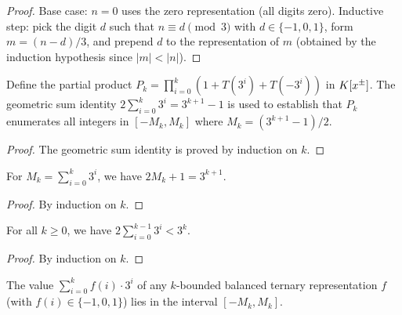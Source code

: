 \begin{proof}
Base case: $n = 0$ uses the zero representation (all digits zero).
Inductive step: pick the digit $d$ such that $n \equiv d \pmod{3}$
with $d \in \{-1, 0, 1\}$, form $m = (n - d)/3$, and prepend $d$
to the representation of $m$ (obtained by the induction hypothesis
since $|m| < |n|$).
\end{proof}

\begin{lemma}
\label{lem.fps.laure.partial-product}
\leanhelper
\leanok
Define the partial product
$P_k = \prod_{i=0}^{k} (1 + T(3^i) + T(-3^i))$ in $K[x^{\pm}]$.
The geometric sum identity
$2 \sum_{i=0}^{k} 3^i = 3^{k+1} - 1$
is used to establish that $P_k$ enumerates all integers
in $[-M_k, M_k]$ where $M_k = (3^{k+1}-1)/2$.
\end{lemma}

\begin{proof}
The geometric sum identity is proved by induction on $k$.
\end{proof}

\begin{lemma}[Cardinality identity: $2 M_k + 1 = 3^{k+1}$]
\label{lem.fps.laure.maxBT-eq}
\leanhelper
\leanok
For $M_k = \sum_{i=0}^{k} 3^i$, we have $2 M_k + 1 = 3^{k+1}$.
\end{lemma}

\begin{proof}
\leanok
By induction on $k$.
\end{proof}

\begin{lemma}[$2 \sum_{i<k} 3^i < 3^k$]
\label{lem.fps.laure.two-sum-lt}
\leanhelper
\leanok
For all $k \ge 0$, we have $2 \sum_{i=0}^{k-1} 3^i < 3^k$.
\end{lemma}

\begin{proof}
\leanok
By induction on $k$.
\end{proof}

\begin{lemma}
\label{lem.fps.laure.kBoundedBTValue-mem}
\leanhelper
\leanok
The value $\sum_{i=0}^{k} f(i) \cdot 3^i$ of any $k$-bounded
balanced ternary representation $f$ (with $f(i) \in \{-1, 0, 1\}$)
lies in the interval $[-M_k, M_k]$.
\end{lemma}


